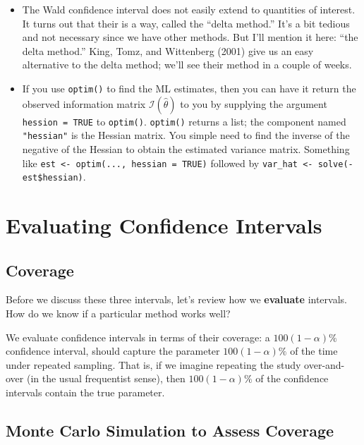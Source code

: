 \documentclass[
]{book}
\providecommand{\tightlist}{%
  \setlength{\itemsep}{0pt}\setlength{\parskip}{0pt}}
\begin{document}
\begin{itemize}
\tightlist
\item
  The Wald confidence interval does not easily extend to quantities of
  interest. It turns out that their is a way, called the ``delta
  method.'' It's a bit tedious and not necessary since we have other
  methods. But I'll mention it here: ``the delta method.'' King, Tomz,
  and Wittenberg (2001) give us an easy alternative to the delta method;
  we'll see their method in a couple of weeks.
\item
  If you use \texttt{optim()} to find the ML estimates, then you can
  have it return the observed information matrix
  \(\mathcal{I}(\hat{\theta})\) to you by supplying the argument
  \texttt{hession\ =\ TRUE} to \texttt{optim()}. \texttt{optim()}
  returns a list; the component named \texttt{"hessian"} is the Hessian
  matrix. You simple need to find the inverse of the negative of the
  Hessian to obtain the estimated variance matrix. Something like
  \texttt{est\ \textless{}-\ optim(...,\ hessian\ =\ TRUE)} followed by
  \texttt{var\_hat\ \textless{}-\ solve(-est\$hessian)}.
\end{itemize}

\hypertarget{evaluating-confidence-intervals}{%
\section{Evaluating Confidence
Intervals}\label{evaluating-confidence-intervals}}

\hypertarget{coverage-1}{%
\subsection{Coverage}\label{coverage-1}}

Before we discuss these three intervals, let's review how we
\textbf{evaluate} intervals. How do we know if a particular method works
well?

We evaluate confidence intervals in terms of their coverage: a
\(100(1 - \alpha)\%\) confidence interval, should capture the parameter
\(100(1 - \alpha)\%\) of the time under repeated sampling. That is, if
we imagine repeating the study over-and-over (in the usual frequentist
sense), then \(100(1 - \alpha)\%\) of the confidence intervals contain
the true parameter.

\hypertarget{monte-carlo-simulation-to-assess-coverage}{%
\subsection{Monte Carlo Simulation to Assess
Coverage}\label{monte-carlo-simulation-to-assess-coverage}}
\end{document}
